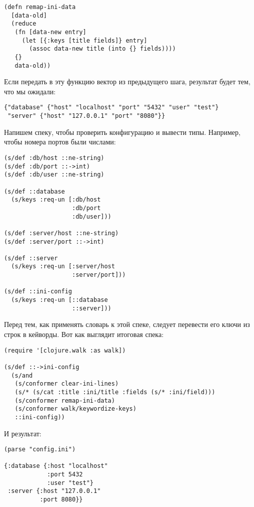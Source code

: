 \begin{verbatim}
(defn remap-ini-data
  [data-old]
  (reduce
   (fn [data-new entry]
     (let [{:keys [title fields]} entry]
       (assoc data-new title (into {} fields))))
   {}
   data-old))
\end{verbatim}

Если передать в эту функцию вектор из предыдущего шага, результат будет тем, что
мы ожидали:

\begin{verbatim}
{"database" {"host" "localhost" "port" "5432" "user" "test"}
 "server" {"host" "127.0.0.1" "port" "8080"}}
\end{verbatim}

Напишем спеку, чтобы проверить конфигурацию и вывести типы. Например, чтобы
номера портов были числами:

\begin{verbatim}
(s/def :db/host ::ne-string)
(s/def :db/port ::->int)
(s/def :db/user ::ne-string)

(s/def ::database
  (s/keys :req-un [:db/host
                   :db/port
                   :db/user]))

(s/def :server/host ::ne-string)
(s/def :server/port ::->int)

(s/def ::server
  (s/keys :req-un [:server/host
                   :server/port]))

(s/def ::ini-config
  (s/keys :req-un [::database
                   ::server]))
\end{verbatim}

Перед тем, как применять словарь к этой спеке, следует перевести его ключи из
строк в кейворды. Вот как выглядит итоговая спека:

\begin{verbatim}
(require '[clojure.walk :as walk])

(s/def ::->ini-config
  (s/and
   (s/conformer clear-ini-lines)
   (s/* (s/cat :title :ini/title :fields (s/* :ini/field)))
   (s/conformer remap-ini-data)
   (s/conformer walk/keywordize-keys)
   ::ini-config))
\end{verbatim}

И результат:

\begin{verbatim}
(parse "config.ini")

{:database {:host "localhost"
            :port 5432
            :user "test"}
 :server {:host "127.0.0.1"
          :port 8080}}
\end{verbatim}

